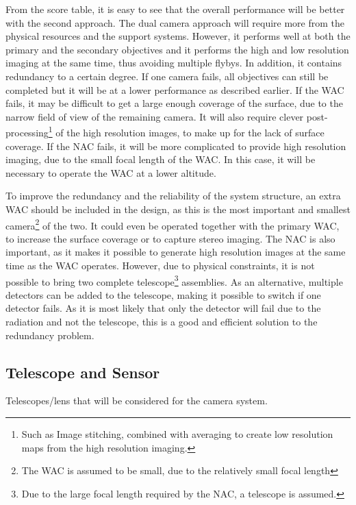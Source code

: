From the score table, it is easy to see that the overall performance will be better with the second approach. The dual camera approach will require more from the physical resources and the support systems. However, it performs well at both the primary and the secondary objectives and it performs the high and low resolution imaging at the same time, thus avoiding multiple flybys. In addition, it contains redundancy to a certain degree. If one camera fails, all objectives can still be completed but it will be at a lower performance as described earlier. If the WAC fails, it may be difficult to get a large enough coverage of the surface, due to the narrow field of view of the remaining camera. It will also require clever post-processing\footnote{Such as Image stitching, combined with averaging to create low resolution maps from the high resolution imaging.} of the high resolution images, to make up for the lack of surface coverage. If the NAC fails, it will be more complicated to provide high resolution imaging, due to the small focal length of the WAC. In this case, it will be necessary to operate the WAC at a lower altitude.

To improve the redundancy and the reliability of the system structure, an extra WAC should be included in the design, as this is the most important and smallest camera\footnote{The WAC is assumed to be small, due to the relatively small focal length} of the two. It could even be operated together with the primary WAC, to increase the surface coverage or to capture stereo imaging. The NAC is also important, as it makes it possible to generate high resolution images at the same time as the WAC operates. However, due to physical constraints, it is not possible to bring two complete telescope\footnote{Due to the large focal length required by the NAC, a telescope is assumed.} assemblies. As an alternative, multiple detectors can be added to the telescope, making it possible to switch if one detector fails. As it is most likely that only the detector will fail due to the radiation and not the telescope, this is a good and efficient solution to the redundancy problem. 
\subsection{Telescope and Sensor}
Telescopes/lens that will be considered for the camera system. 

